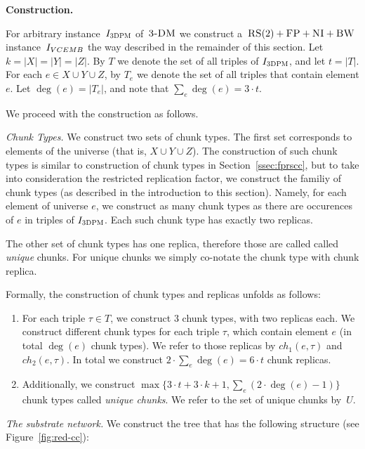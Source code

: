 \noindent \textbf{Construction.}

For arbitrary instance~$I_{\textsc{3DPM}}$ of~$\textsc{3-DM}$ we construct a~$\textsc{RS}(2)+\textsc{FP}+\textsc{NI}+\textsc{BW}$ instance~$I_{VCEMB}$ the way described in the remainder of this section.
Let $k = |X|=|Y|=|Z|$.
By $T$ we denote the set of all triples of $I_{\textsc{3DPM}}$, and let $t = |T|$.
For each $e\in X\cup Y\cup Z$, by $T_e$ we denote the set of all triples that contain element $e$.
Let $\deg(e) = |T_e|$, and note that $\sum_e \deg(e) = 3\cdot t$.

We proceed with the construction as follows.

\emph{Chunk Types.}
We construct two sets of chunk types.
The first set corresponds to elements of the universe (that is, $X\cup Y\cup Z$).
The construction of such chunk types is similar to construction of chunk types in Section~\ref{ssec:fprscc}, but to take into consideration the restricted replication factor, we construct the familiy of chunk types (as described in the introduction to this section).
Namely, for each element of universe $e$, we construct as many chunk types as there are occurences of $e$ in triples of $I_{\textsc{3DPM}}$.
Each such chunk type has exactly two replicas.

The other set of chunk types has one replica, therefore those are called called \emph{unique} chunks.
For unique chunks we simply co-notate the chunk type with chunk replica.

Formally, the construction of chunk types and replicas unfolds as follows:
\begin{enumerate}
  \item For each triple $\tau \in T$, we construct $3$ chunk types, with two replicas each.
  We construct different chunk types for each triple $\tau$, which contain element $e$ (in total $\deg(e)$ chunk types).
  We refer to those replicas by $ch_1(e, \tau)$ and $ch_2(e, \tau)$.
  In total we construct $2\cdot \sum_e\deg(e) = 6\cdot t$ chunk replicas.
  \item Additionally, we construct
$\max\{3\cdot t + 3\cdot k + 1, \sum_e(2\cdot \deg(e)-1)\}$
chunk types called \emph{unique chunks}. We
refer to the set of unique chunks by~$U$.
\end{enumerate}

\emph{The substrate network.}
We construct the tree that has the following structure (see Figure~\ref{fig:red-cc}):

